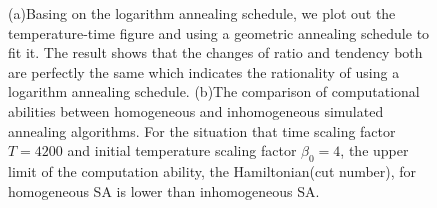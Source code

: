 \documentclass{turabian-researchpaper}
\begin{document}
        \begin{figure}
            \centering
            \caption{(a)Basing on the logarithm annealing schedule, we plot out the temperature-time figure and using a geometric annealing schedule to fit it. The result shows that the changes of ratio and tendency both are perfectly the same which indicates the rationality of using a logarithm annealing schedule. (b)The comparison of computational abilities between homogeneous and inhomogeneous simulated annealing algorithms. For the situation that time scaling factor $T = 4200$ and initial temperature scaling factor $\beta_0 = 4$, the upper limit of the computation ability, the Hamiltonian(cut number), for homogeneous SA is lower than inhomogeneous SA.}
        \end{figure}
\end{document}
